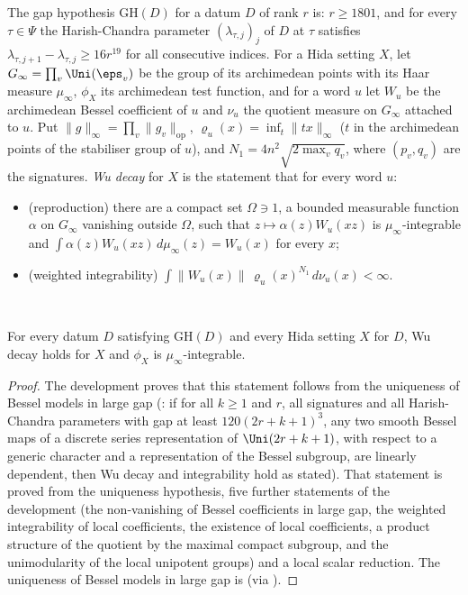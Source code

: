 \begin{definition}\label{pf:sh-flag:defwu}
The gap hypothesis $\mathrm{GH}(D)$ for a datum $D$ of rank $r$ is: $r\ge1801$, and for every $\tau\in\Psi$ the
Harish-Chandra parameter $(\lambda_{\tau,j})_j$ of $D$ at $\tau$ satisfies
$\lambda_{\tau,j+1}-\lambda_{\tau,j}\ge16r^{19}$ for all consecutive indices. For a Hida setting $X$, let
$G_\infty=\prod_v\Uni(\eps_v)$ be the group of its archimedean points with its Haar measure $\mu_\infty$,
$\phi_X$ its archimedean test function, and for a word $u$ let $W_u$ be the archimedean Bessel coefficient of
$u$ and $\nu_u$ the quotient measure on $G_\infty$ attached to $u$. Put
$\|g\|_\infty=\prod_v\|g_v\|_{\mathrm{op}}$, $\varrho_u(x)=\inf_t\|tx\|_\infty$ ($t$ in the archimedean points of
the stabiliser group of $u$), and $N_1=4n^2\sqrt{2\max_vq_v}$, where $(p_v,q_v)$ are the signatures. \emph{Wu
decay} for $X$ is the statement that for every word $u$:
\begin{itemize}
\item (reproduction) there are a compact set $\Omega\ni1$, a bounded measurable function $\alpha$ on $G_\infty$
vanishing outside $\Omega$, such that $z\mapsto\alpha(z)W_u(xz)$ is $\mu_\infty$-integrable and
$\int\alpha(z)W_u(xz)\,d\mu_\infty(z)=W_u(x)$ for every $x$;
\item (weighted integrability) $\int\|W_u(x)\|\,\varrho_u(x)^{N_1}\,d\nu_u(x)<\infty$.
\end{itemize}
\ 
\end{definition}

\begin{proposition}\label{pf:sh-flag:wu}
For every datum $D$ satisfying $\mathrm{GH}(D)$ and every Hida setting $X$ for $D$, Wu decay holds for $X$ and
$\phi_X$ is $\mu_\infty$-integrable.
\end{proposition}

\begin{proof}
The development proves that this statement follows from the uniqueness of Bessel models in large gap
(: if for all $k\ge1$ and $r$, all signatures and all
Harish-Chandra parameters with gap at least $120(2r+k+1)^3$, any two smooth Bessel maps of a discrete series
representation of $\Uni(2r+k+1)$, with respect to a generic character and a representation of the Bessel
subgroup, are linearly dependent, then Wu decay and integrability hold as stated). That statement is proved from
the uniqueness hypothesis, five further statements of the development (the non-vanishing of Bessel coefficients
in large gap, the weighted integrability of local coefficients, the existence of local coefficients, a product
structure of the quotient by the maximal compact subgroup, and the unimodularity of the local unipotent groups)
and a local scalar reduction. The uniqueness of Bessel models in large gap is
 (via ).
\end{proof}

